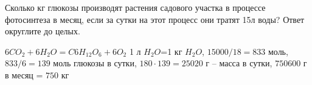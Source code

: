 
Сколько кг глюкозы производят растения садового участка в процессе фотосинтеза в месяц, если за сутки на этот процесс они тратят 15л воды? Ответ округлите до целых.

\solutionSection

$6CO_2+6H_2O=C6H_{12}O_6+6O_2$ 1 л $H_2O$=1 кг $H_2O$, 
$15000/18=833$ моль, \linebreak $833/6=139$ моль глюкозы в сутки, $180 \cdot 139 = 25020$ г – масса в сутки, 
$750600$ г в месяц = $750$ кг


